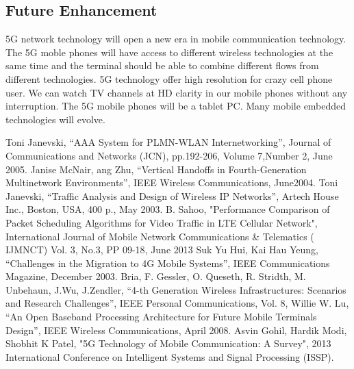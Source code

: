 \documentclass[conference]{IEEEtran}
\begin{document}
\subsection{Future Enhancement}
     5G network technology will open a new era in mobile communication technology. The 5G moble phones will have access to different wireless technologies at the same time and the terminal should be able to combine different flows from different technologies. 5G technology offer high resolution for crazy cell phone user. We can watch TV channels at HD clarity in our mobile phones without any interruption. The 5G mobile phones will be a tablet PC. Many mobile embedded technologies will evolve.
\begin{thebibliography}{1}
Toni Janevski, “AAA System for PLMN-WLAN Internetworking”, Journal of    Communications and Networks (JCN), pp.192-206, Volume 7,Number 2, June 2005.
Janise McNair, ang Zhu, “Vertical Handoffs in Fourth-Generation Multinetwork Environments”, IEEE Wireless Communications, June2004.
Toni Janevski, “Traffic Analysis and Design of Wireless IP Networks”, Artech House Inc., Boston, USA, 400 p., May 2003.
B. Sahoo, "Performance Comparison of Packet Scheduling Algorithms for Video Traffic in LTE Cellular Network", International Journal of Mobile Network Communications \& Telematics ( IJMNCT) Vol. 3, No.3, PP 09-18, June 2013
Suk Yu Hui, Kai Hau Yeung, “Challenges in the Migration to 4G Mobile Systems”, IEEE Communications Magazine, December 2003.
Bria, F. Gessler, O. Queseth, R. Stridth, M. Unbehaun, J.Wu, J.Zendler, “4-th Generation Wireless Infrastructures: Scenarios and Research Challenges”, IEEE Personal Communications, Vol. 8,                                                                   
Willie W. Lu, “An Open Baseband Processing Architecture for Future Mobile Terminals Design”, IEEE Wireless Communications, April 2008.
Asvin Gohil, Hardik Modi, Shobhit K Patel, "5G Technology of Mobile Communication: A Survey", 2013 International Conference on Intelligent Systems and Signal Processing (ISSP).
\end{thebibliography}
\end{document}
